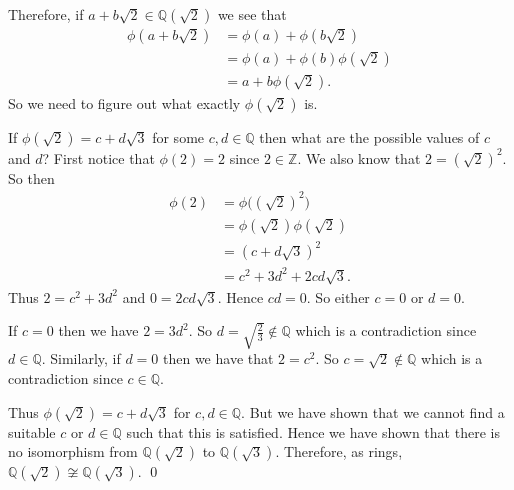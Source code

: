 \documentclass{article}
\begin{document}
Therefore, if $a + b\sqrt{2} \in \mathbb{Q}(\sqrt{2})$ we see that 
\begin{align*}
	\phi(a + b\sqrt{2}) &= \phi(a) + \phi(b\sqrt{2}) \\
	&= \phi(a) + \phi(b) \phi(\sqrt{2}) \\
	&= a + b \phi(\sqrt{2}).
\end{align*}
So we need to figure out what exactly $\phi(\sqrt{2})$ is.

If $\phi(\sqrt{2}) = c + d\sqrt{3}$ for some $c, d \in \mathbb{Q}$ then what are the possible values of $c$ and $d$? First notice that $\phi(2) = 2$ since $2 \in \mathbb{Z}$. We also know that $2 = (\sqrt{2})^2$. So then 
\begin{align*} 
	\phi(2)  &= \phi \big( (\sqrt{2})^2 \big) \\
	&= \phi(\sqrt{2}) \phi(\sqrt{2}) \\
	&= (c+d\sqrt{3})^2 \\
	&= c^2 + 3d^2 + 2cd\sqrt{3}.
\end{align*}
Thus $2 = c^2 + 3d^2$ and $0 = 2cd\sqrt{3}$. Hence $cd = 0$. So either $c = 0$ or $d = 0$. 

If $c = 0$ then we have $2 = 3d^2$. So $d = \sqrt{\frac 23} \not \in \mathbb{Q}$ which is a contradiction since $d \in \mathbb{Q}$. Similarly, if $d = 0$ then we have that $2 = c^2$. So $c = \sqrt 2 \not \in \mathbb{Q}$ which is a contradiction since $c \in \mathbb{Q}$.

Thus $\phi(\sqrt{2}) = c + d\sqrt{3}$ for $c, d \in \mathbb{Q}$. But we have shown that we cannot find a suitable $c$ or $d \in \mathbb{Q}$ such that this is satisfied. Hence we have shown that there is no isomorphism from $\mathbb{Q}(\sqrt{2})$ to $\mathbb{Q}(\sqrt{3})$. Therefore, as rings, $\mathbb{Q}(\sqrt{2}) \not \cong \mathbb{Q}(\sqrt{3})$. \qed \\
\end{document}

